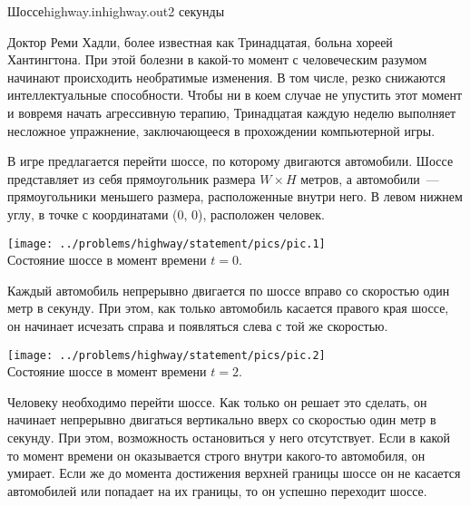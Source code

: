 \begin{problem}{Шоссе}{highway.in}{highway.out}{2 секунды}




Доктор Реми Хадли, более известная как Тринадцатая, больна хореей Хантингтона. При этой болезни в какой-то момент с человеческим разумом начинают 
происходить необратимые изменения. В том числе, резко снижаются интеллектуальные способности. Чтобы ни в коем случае не упустить этот момент и 
вовремя начать агрессивную терапию, Тринадцатая каждую неделю выполняет несложное упражнение, заключающееся в прохождении компьютерной игры.

В игре предлагается перейти шоссе, по которому двигаются автомобили. Шоссе представляет из себя прямоугольник размера $W{\times}H$ метров, а 
автомобили~--- прямоугольники меньшего размера, расположенные внутри него. В левом нижнем углу, в точке с координатами (0, 0), расположен человек.

\begin{center}
	\texttt{[image: ../problems/highway/statement/pics/pic.1]}\\
	Состояние шоссе в момент времени $t = 0$.
\end{center}

Каждый автомобиль непрерывно двигается по шоссе вправо со скоростью один метр в секунду. При этом, как только автомобиль касается правого края шоссе, 
он начинает исчезать справа и появляться слева с той же скоростью.

\begin{center}
	\texttt{[image: ../problems/highway/statement/pics/pic.2]}\\
	Состояние шоссе в момент времени $t = 2$.
\end{center}
 
Человеку необходимо перейти шоссе. Как только он решает это сделать, он начинает непрерывно двигаться вертикально вверх со скоростью один метр в 
секунду. При этом, возможность остановиться у него отсутствует. Если в какой то момент времени он оказывается строго внутри какого-то автомобиля, 
он умирает. Если же до момента достижения верхней границы шоссе он не касается автомобилей или попадает на их границы, то он успешно переходит 
шоссе.


\end{problem}
